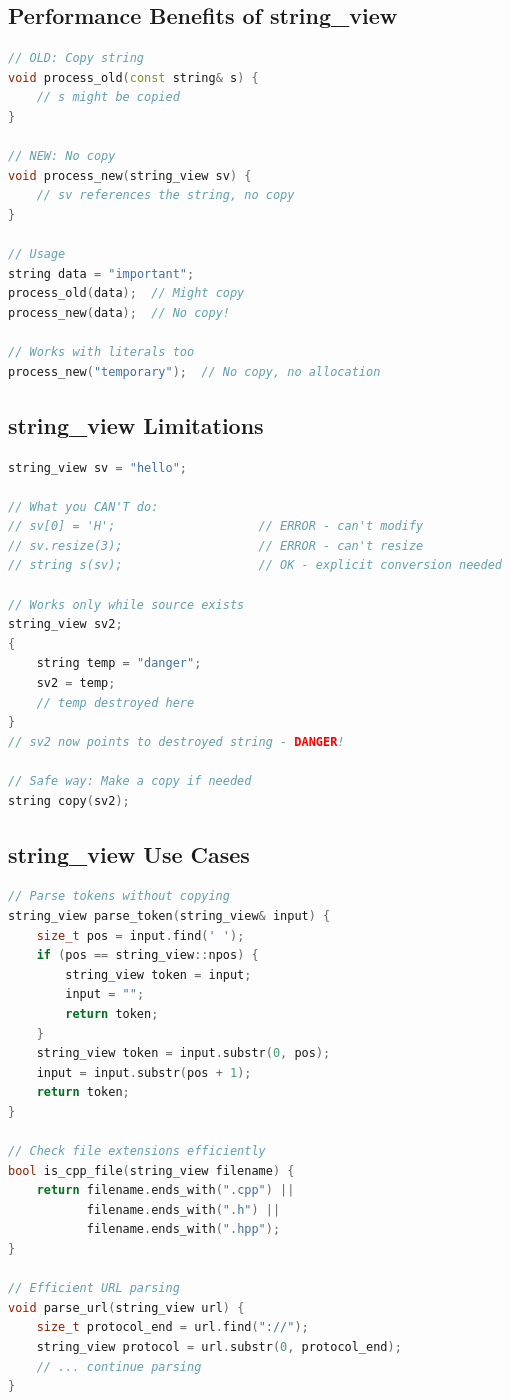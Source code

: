 \hypertarget{performance-benefits-of-string_view}{%
\subsection{Performance Benefits of
string\_view}\label{performance-benefits-of-string_view}}

\begin{lstlisting}[language={C++}]
// OLD: Copy string
void process_old(const string& s) {
    // s might be copied
}

// NEW: No copy
void process_new(string_view sv) {
    // sv references the string, no copy
}

// Usage
string data = "important";
process_old(data);  // Might copy
process_new(data);  // No copy!

// Works with literals too
process_new("temporary");  // No copy, no allocation
\end{lstlisting}

\hypertarget{string_view-limitations}{%
\subsection{string\_view Limitations}\label{string_view-limitations}}

\begin{lstlisting}[language={C++}]
string_view sv = "hello";

// What you CAN'T do:
// sv[0] = 'H';                    // ERROR - can't modify
// sv.resize(3);                   // ERROR - can't resize
// string s(sv);                   // OK - explicit conversion needed

// Works only while source exists
string_view sv2;
{
    string temp = "danger";
    sv2 = temp;
    // temp destroyed here
}
// sv2 now points to destroyed string - DANGER!

// Safe way: Make a copy if needed
string copy(sv2);
\end{lstlisting}

\hypertarget{string_view-use-cases}{%
\subsection{string\_view Use Cases}\label{string_view-use-cases}}

\begin{lstlisting}[language={C++}]
// Parse tokens without copying
string_view parse_token(string_view& input) {
    size_t pos = input.find(' ');
    if (pos == string_view::npos) {
        string_view token = input;
        input = "";
        return token;
    }
    string_view token = input.substr(0, pos);
    input = input.substr(pos + 1);
    return token;
}

// Check file extensions efficiently
bool is_cpp_file(string_view filename) {
    return filename.ends_with(".cpp") || 
           filename.ends_with(".h") ||
           filename.ends_with(".hpp");
}

// Efficient URL parsing
void parse_url(string_view url) {
    size_t protocol_end = url.find("://");
    string_view protocol = url.substr(0, protocol_end);
    // ... continue parsing
}
\end{lstlisting}

